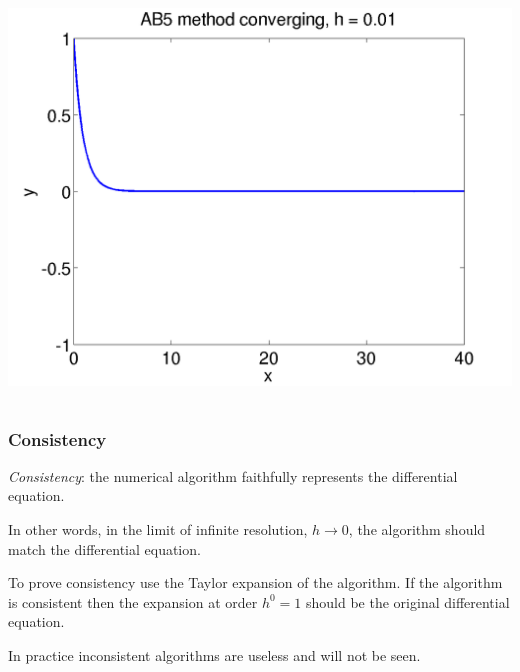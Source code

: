 \documentclass{beamer}
\begin{document}
\begin{frame}
\begin{columns}
\begin{column}{0.5\textwidth}
\begin{overlayarea}{\textwidth}{0.6\textheight}
{        }
        {
          \begin{center}
            \includegraphics[height=0.5\textheight]{figures/AB5Stability}
          \end{center}
        }
      \end{overlayarea}
    \end{column}
 \end{columns}


\end{frame}



\begin{frame}
  \frametitle{Consistency}

  \emph{Consistency}: the numerical algorithm faithfully represents
  the differential equation. \pause

  \vspace{1ex}

  In other words, in the limit of infinite resolution, $h \rightarrow
  0$, the algorithm should match the differential equation. \pause

  \vspace{1ex}

  To prove consistency use the Taylor expansion of the algorithm. If
  the algorithm is consistent then the expansion at order $h^0 = 1$
  should be the original differential equation. \pause

  \vspace{1ex}

  In practice inconsistent algorithms are useless and will not be seen.

\end{frame}
\end{document}
